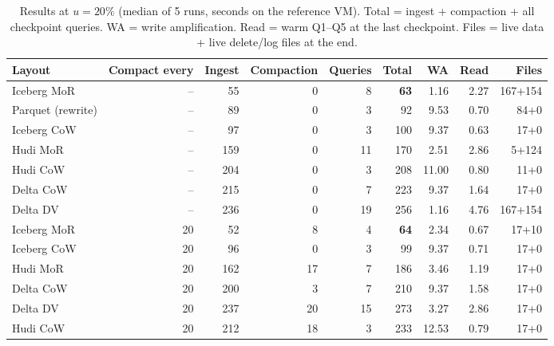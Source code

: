 \documentclass[conference]{IEEEtran}
\begin{document}
\begin{table}[t]\centering
\caption{Results at $u=20\%$ (median of 5 runs, seconds on the reference VM). Total = ingest + compaction + all
checkpoint queries. WA = write amplification. Read = warm Q1--Q5 at the last checkpoint. Files = live data + live
delete/log files at the end.}\label{tab:u20}
\footnotesize
\begin{tabular}{@{}lrrrrrrrr@{}}\toprule
Layout & Compact every & Ingest & Compaction & Queries & Total & WA & Read & Files\\\midrule
Iceberg MoR & -- & 55 & 0 & 8 & \textbf{63} & 1.16 & 2.27 & 167+154\\
Parquet (rewrite) & -- & 89 & 0 & 3 & 92 & 9.53 & 0.70 & 84+0\\
Iceberg CoW & -- & 97 & 0 & 3 & 100 & 9.37 & 0.63 & 17+0\\
Hudi MoR & -- & 159 & 0 & 11 & 170 & 2.51 & 2.86 & 5+124\\
Hudi CoW & -- & 204 & 0 & 3 & 208 & 11.00 & 0.80 & 11+0\\
Delta CoW & -- & 215 & 0 & 7 & 223 & 9.37 & 1.64 & 17+0\\
Delta DV & -- & 236 & 0 & 19 & 256 & 1.16 & 4.76 & 167+154\\\midrule
Iceberg MoR & 20 & 52 & 8 & 4 & \textbf{64} & 2.34 & 0.67 & 17+10\\
Iceberg CoW & 20 & 96 & 0 & 3 & 99 & 9.37 & 0.71 & 17+0\\
Hudi MoR & 20 & 162 & 17 & 7 & 186 & 3.46 & 1.19 & 17+0\\
Delta CoW & 20 & 200 & 3 & 7 & 210 & 9.37 & 1.58 & 17+0\\
Delta DV & 20 & 237 & 20 & 15 & 273 & 3.27 & 2.86 & 17+0\\
Hudi CoW & 20 & 212 & 18 & 3 & 233 & 12.53 & 0.79 & 17+0\\\bottomrule
\end{tabular}
\end{table}
\end{document}
